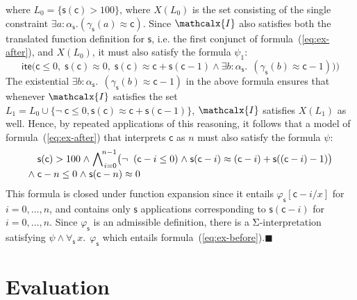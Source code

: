 \documentclass[runningheads,a4paper]{llncs}
\newcommand{\con}[1]{\mathsf{#1}}
\let\oldSigma=\Sigma
\def\Sigma{\mathrm{\oldSigma}}
\let\oldneg=\neg
\def\neg{\oldneg\;}
\let\oldwedge=\wedge
\def\wedge{\mathrel{\oldwedge}}
\newcommand{\teq}{\approx}
\newcommand{\I}{\mathcalx{I}}
\newcommand{\lite}{\con{ite}}
\newcommand\concret{\gamma} %
\newcommand{\forallf}[1]{\forall_{\!#1\:}}
\newcommand{\farg}[1]{\concret_{#1}}
\newcommand{\fargtype}[1]{\alpha_{#1}}
\newcommand{\vthinspace}{\kern+0.083333em}
\newcommand{\absconstraints}{X}
\newcommand\xend{{\hfill$\scriptstyle\blacksquare$}}
\begin{document}
\begin{example}
where $L_0 = \{ \con{s}( \con{c} ) > 100 \}$, 
where $\absconstraints( L_0 )$ is the set consisting of the single constraint $\exists a : {\fargtype{\con{s}}}. (\farg{\con{s}}( a ) \teq \con{c})$.
Since $\I$ also satisfies both the translated function definition for $\con{s}$, i.e. the first conjunct of formula~(\ref{eq:ex-after}),
and $\absconstraints( L_0 )$, it must also satisfy the formula $\psi_1$:
\[
\lite\bigl( \con{c} \leq 0,\; 
            \con{s}(\con{c}) \teq 0,\;
            \con{s}(\con{c}) \teq \con{c} + \con{s}( \con{c}-1 )
            \wedge \exists b : {\fargtype{\con{s}}}.\;\, (\farg{\con{s}}( b ) \teq \con{c}-1) \bigr) \bigr)
\]
The existential $\exists b : {\fargtype{\con{s}}}.\;\, (\farg{\con{s}}( b ) \teq \con{c}-1)$ in the above formula
ensures that whenever $\I$ satisfies the set $L_1 = L_0 \cup \{ \neg \con{c} \leq 0, \con{s}(\con{c}) \teq \con{c} + \con{s}( \con{c}-1 ) \}$,
$\I$ satisfies $\absconstraints( L_1 )$ as well.
Hence, by repeated applications of this reasoning, it follows that
a model of formula~(\ref{eq:ex-after}) that interprets $\con{c}$ as $n$ must also satisfy the formula $\psi$:
%
\begin{equation} \label{eq:fun-closure}
\begin{split}
& \con{s}( \con{c} ) > 100 \wedge %
  \bigwedge\nolimits_{\vthinspace i=0}^{\!n-1} \bigl( \neg (\con{c}-i \leq 0) \wedge \con{s}( \con{c}-i ) \teq (\con{c}-i) + \con{s}( (\con{c}-i)-1 ) \bigr) \\[-\jot]
{\wedge}\; & \con{c}-n \leq 0 \wedge \con{s}( \con{c}-n ) \teq 0
\end{split}
\end{equation}
%
This formula is closed under function expansion
since it entails $\varphi_\con{s}[\con{c}-i/x]$ for $i = 0, \ldots, n$,
and contains only $\con{s}$ applications corresponding to $\con{s}( \con{c}-i )$ for $i = 0, \ldots, n$.
Since $\varphi_\con{s}$ is an admissible definition,
there is a $\Sigma$-interpretation satisfying $\psi \wedge \forallf{\con{s}} x.\;\, \varphi_\con{s}$
which entails formula~(\ref{eq:ex-before}).\xend
\end{example}

\section{Evaluation}
\label{sec:evaluation}
\end{document}
